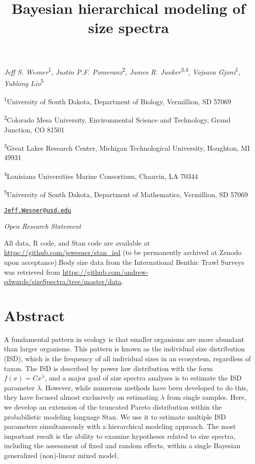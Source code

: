 \documentclass[
  12pt,
]{article}
\title{Bayesian hierarchical modeling of size spectra}
\author{}
\date{\vspace{-2.5em}}
\begin{document}
\maketitle

\emph{Jeff S. Wesner}\textsuperscript{1}, \emph{Justin P.F.
Pomeranz}\textsuperscript{2}, \emph{James R.
Junker}\textsuperscript{3,4}, \emph{Vojsava Gjoni}\textsuperscript{1},
\emph{Yuhlong Lio}\textsuperscript{5}

\textsuperscript{1}University of South Dakota, Department of Biology,
Vermillion, SD 57069

\textsuperscript{2}Colorado Mesa University, Environmental Science and
Technology, Grand Junction, CO 81501

\textsuperscript{3}Great Lakes Research Center, Michigan Technological
University, Houghton, MI 49931

\textsuperscript{4}Louisiana Universities Marine Consortium, Chauvin, LA
70344

\textsuperscript{5}University of South Dakota, Department of
Mathematics, Vermillion, SD 57069

\href{mailto:Jeff.Wesner@usd.edu}{\nolinkurl{Jeff.Wesner@usd.edu}}

\emph{Open Research Statement}

All data, R code, and Stan code are available at
\url{https://github.com/jswesner/stan_isd} (to be permanently archived
at Zenodo upon acceptance).Body size data from the International Benthic
Trawl Surveys was retrieved from
\url{https://github.com/andrew-edwards/sizeSpectra/tree/master/data}.

\newpage

\hypertarget{abstract}{%
\section{Abstract}\label{abstract}}

A fundamental pattern in ecology is that smaller organisms are more
abundant than larger organisms. This pattern is known as the individual
size distribution (ISD), which is the frequency of all individual sizes
in an ecosystem, regardless of taxon. The ISD is described by power law
distribution with the form \(f(x) = Cx^{\lambda}\), and a major goal of
size spectra analyses is to estimate the ISD parameter \(\lambda\).
However, while numerous methods have been developed to do this, they
have focused almost exclusively on estimating \(\lambda\) from single
samples. Here, we develop an extension of the truncated Pareto
distribution within the probabilistic modeling language Stan. We use it
to estimate multiple ISD parameters simultaneously with a hierarchical
modeling approach. The most important result is the ability to examine
hypotheses related to size spectra, including the assessment of fixed
and random effects, within a single Bayesian generalized (non)-linear
mixed model.
\end{document}
